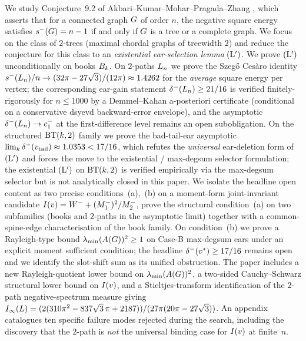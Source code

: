We study Conjecture~9.2 of Akbari--Kumar--Mohar--Pragada--Zhang
\cite{AKMPZ2025}, which asserts that for a connected graph $G$ of
order $n$, the negative square energy satisfies $s^{-}(G) = n-1$ if and
only if $G$ is a tree or a complete graph. We focus on the class of
$2$-trees (maximal chordal graphs of treewidth $2$) and reduce the
conjecture for this class to an \emph{existential ear-selection lemma}
$(\mathrm{L}')$. We prove $(\mathrm{L}')$ unconditionally on books $B_{k}$. On $2$-paths $L_{n}$ we
prove the Szeg\H{o} Ces\`aro identity
$s^{-}(L_{n})/n \to (32\pi - 27\sqrt{3})/(12\pi) \approx 1.4262$ for the
\emph{average} square energy per vertex; the corresponding
ear-gain statement $\delta^{-}(L_{n}) \ge 21/16$ is verified
finitely-rigorously for $n \le 1000$ by a Demmel--Kahan a-posteriori
certificate (conditional on a conservative dsyevd backward-error
envelope), and the asymptotic $\delta^{-}(L_{n}) \to c_{1}^{-}$ at the
first-difference level remains an open subobligation. On the structured $\mathrm{BT}(k,2)$ family
we prove the bad-tail-ear asymptotic
$\lim_{k} \delta^{-}(v_{\mathrm{tail}}) \approx 1.0353 < 17/16$, which
refutes the \emph{universal} ear-deletion form of $(\mathrm{L}')$ and forces
the move to the existential / max-degsum selector formulation; the
existential $(\mathrm{L}')$ on $\mathrm{BT}(k,2)$ is verified empirically via the
max-degsum selector but is not analytically closed in this paper. We isolate the headline open
content as two precise conditions~(a),~(b) on a moment-form
joint-invariant candidate $I(v) = W^{-} + (M_{1}^{-})^{2}/M_{2}^{-}$, prove the
structural condition~(a) on two subfamilies (books and $2$-paths in
the asymptotic limit) together with a common-spine-edge
characterisation of the book family. On
condition~(b) we prove a Rayleigh-type bound
$\lambda_{\min}(A(G))^{2} \ge 1$ on Case-B max-degsum ears
under an explicit moment sufficient condition; the headline
$\delta^{-}(v^{*}) \ge 17/16$ remains open and we identify the
slot-shift sum as its unified obstruction. The paper includes a new Rayleigh-quotient lower
bound on $\lambda_{\min}(A(G))^{2}$, a two-sided
Cauchy--Schwarz structural lower bound on $I(v)$, and a
Stieltjes-transform identification of the $2$-path negative-spectrum
measure giving
$I_{\infty}(L) = (2(310\pi^{2} - 837\sqrt{3}\,\pi + 2187))/(27\pi(20\pi -
27\sqrt{3}))$. An appendix catalogues ten specific failure modes
rejected during the search, including the discovery that the $2$-path
is \emph{not} the universal binding case for $I(v)$ at finite~$n$.
